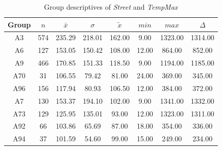 \begin{table}[ht]
	\tiny
	\centering
	\begin{tabular}{c|c|c|c|c|c|c|c}
		\toprule
		Group & $n$ & $\bar{x}$ & $\sigma$ & $\tilde{x}$ & $min$ & $max$ & $\Delta$ \\ 
		\midrule
		A3 & 574 & 235.29 & 218.01 & 162.00 & 9.00 & 1323.00 & 1314.00   \\ 
		A6 & 127 & 153.05 & 150.42 & 108.00 & 12.00 & 864.00 & 852.00   \\ 
		A9 & 466 & 170.85 & 151.33 & 118.50 & 9.00 & 1194.00 & 1185.00   \\ 
		A70 & 31 & 106.55 & 79.42 & 81.00 & 24.00 & 369.00 & 345.00   \\ 
		A96 & 156 & 117.94 & 80.93 & 106.50 & 12.00 & 384.00 & 372.00   \\ 
		A7 & 130 & 153.37 & 194.10 & 102.00 & 9.00 & 1341.00 & 1332.00  \\ 
		A73 & 129 & 125.95 & 135.01 & 93.00 & 12.00 & 1323.00 & 1311.00  \\ 
		A92 & 66 & 103.86 & 65.69 & 87.00 & 18.00 & 354.00 & 336.00 \\ 
		A94 & 37 & 101.59 & 54.60 & 99.00 & 15.00 & 249.00 & 234.00 \\ 
 		\bottomrule
	\end{tabular}
	\caption{Group descriptives of \textit{Street} and \textit{TempMax}}
	\label{tbl:descriptives_baysis_matched_Strasse_TMax}
	\vspace{-8mm}
\end{table}

